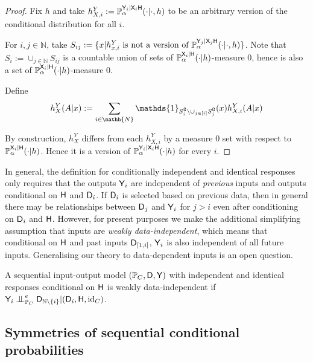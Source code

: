 \begin{proof}
Fix $h$ and take $h^Y_{X,i}:=\mathbb{P}_\alpha^{\mathsf{Y}_i|\mathsf{X}_i\mathsf{H}}(\cdot|\cdot,h)$ to be an arbitrary version of the conditional distribution for all $i$.

For $i,j\in \mathbb{N}$, take $S_{ij} := \{x|h^Y_{x,i}\text{ is not a version of }\mathbb{P}_\alpha^{\mathsf{Y}_j|\mathsf{X}_j\mathsf{H}}(\cdot|\cdot,h)\}$. Note that $S_i:= \cup_{j\in \mathbb{N}} S_{ij}$ is a countable union of sets of $\mathbb{P}_\alpha^{\mathsf{X}_i|\mathsf{H}}(\cdot|h)$-measure 0, hence is also a set of $\mathbb{P}_\alpha^{\mathsf{X}_i|\mathsf{H}}(\cdot|h)$-measure 0.

Define
\begin{align}
    h^Y_X(A|x) := \sum_{i\in \mathh{N}} \mathds{1}_{S_i^\complement\setminus \cup_{j\in[i]}S_j^\complement}(x) h^Y_{X,i}(A|x)
\end{align}

By construction, $h^Y_X$ differs from each $h^Y_{X,i}$ by a measure 0 set with respect to $\mathbb{P}_\alpha^{\mathsf{X}_i|\mathsf{H}}(\cdot|h)$. Hence it is a version of $\mathbb{P}_\alpha^{\mathsf{Y}_i|\mathsf{X}_i\mathsf{H}}(\cdot|h)$ for every $i$.
\end{proof}

In general, the definition for conditionally independent and identical responses only requires that the outputs $\mathsf{Y}_i$ are independent of \emph{previous} inputs and outputs conditional on $\mathsf{H}$ and $\mathsf{D}_i$. If $\mathsf{D}_i$ is selected based on previous data, then in general there may be relationships between $\mathsf{D}_j$ and $\mathsf{Y}_i$ for $j>i$ even after conditioning on $\mathsf{D}_i$ and $\mathsf{H}$. However, for present purposes we make the additional simplifying assumption that inputs are \emph{weakly data-independent}, which means that conditional on $\mathsf{H}$ and past inputs $\mathsf{D}_{[1,i]}$, $\mathsf{Y}_i$ is also independent of all future inputs. Generalising our theory to data-dependent inputs is an open question.

\begin{definition}\label{def:weak_di}
A sequential input-output model $(\mathbb{P}_C,\mathsf{D},\mathsf{Y})$ with independent and identical responses conditional on $\mathsf{H}$ is weakly data-independent if $\RV{Y}_i\CI^e_{\prob{P}_C} \RV{D}_{\mathbb{N}\setminus\{i\}}|(\RV{D}_{i},\RV{H},\text{id}_C)$.
\end{definition}

\subsection[Conditional probability symmetries]{Symmetries of sequential conditional probabilities}\label{sec:ccontracibility}

